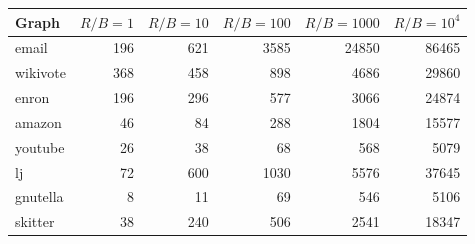 \begin{tabular}{lrrrrr}
\toprule
Graph & $R/B{=}1$ & $R/B{=}10$ & $R/B{=}100$ & $R/B{=}1000$ & $R/B{=}10^4$ \\
\midrule
email & 196 & 621 & 3585 & 24850 & 86465 \\
wikivote & 368 & 458 & 898 & 4686 & 29860 \\
enron & 196 & 296 & 577 & 3066 & 24874 \\
amazon & 46 & 84 & 288 & 1804 & 15577 \\
youtube & 26 & 38 & 68 & 568 & 5079 \\
lj & 72 & 600 & 1030 & 5576 & 37645 \\
gnutella & 8 & 11 & 69 & 546 & 5106 \\
skitter & 38 & 240 & 506 & 2541 & 18347 \\
\bottomrule
\end{tabular}
